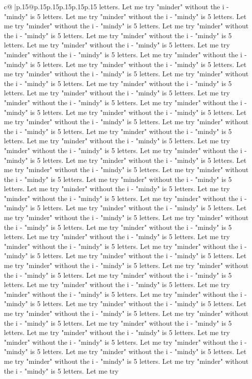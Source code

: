 \documentclass{article}
\begin{document}
{\begin{supertabular}{c@{$\;$}|p{.15\linewidth}@{}p{.15\linewidth}p{.15\linewidth}p{.15\linewidth}p{.15\linewidth}p{.15\linewidth}}
{{{letters. Let me try "minder" without the i {-} "mindy" is 5 letters. Let me try "minder" without the i {-} "mindy" is 5 letters. Let me try "minder" without the i {-} "mindy" is 5 letters. Let me try "minder" without the i {-} "mindy" is 5 letters. Let me try "minder" without the i {-} "mindy" is 5 letters. Let me try "minder" without the i {-} "mindy" is 5 letters. Let me try "minder" without the i {-} "mindy" is 5 letters. Let me try "minder" without the i {-} "mindy" is 5 letters. Let me try "minder" without the i {-} "mindy" is 5 letters. Let me try "minder" without the i {-} "mindy" is 5 letters. Let me try "minder" without the i {-} "mindy" is 5 letters. Let me try "minder" without the i {-} "mindy" is 5 letters. Let me try "minder" without the i {-} "mindy" is 5 letters. Let me try "minder" without the i {-} "mindy" is 5 letters. Let me try "minder" without the i {-} "mindy" is 5 letters. Let me try "minder" without the i {-} "mindy" is 5 letters. Let me try "minder" without the i {-} "mindy" is 5 letters. Let me try "minder" without the i {-} "mindy" is 5 letters. Let me try "minder" without the i {-} "mindy" is 5 letters. Let me try "minder" without the i {-} "mindy" is 5 letters. Let me try "minder" without the i {-} "mindy" is 5 letters. Let me try "minder" without the i {-} "mindy" is 5 letters. Let me try "minder" without the i {-} "mindy" is 5 letters. Let me try "minder" without the i {-} "mindy" is 5 letters. Let me try "minder" without the i {-} "mindy" is 5 letters. Let me try "minder" without the i {-} "mindy" is 5 letters. Let me try "minder" without the i {-} "mindy" is 5 letters. Let me try "minder" without the i {-} "mindy" is 5 letters. Let me try "minder" without the i {-} "mindy" is 5 letters. Let me try "minder" without the i {-} "mindy" is 5 letters. Let me try "minder" without the i {-} "mindy" is 5 letters. Let me try "minder" without the i {-} "mindy" is 5 letters. Let me try "minder" without the i {-} "mindy" is 5 letters. Let me try "minder" without the i {-} "mindy" is 5 letters. Let me try "minder" without the i {-} "mindy" is 5 letters. Let me try "minder" without the i {-} "mindy" is 5 letters. Let me try "minder" without the i {-} "mindy" is 5 letters. Let me try "minder" without the i {-} "mindy" is 5 letters. Let me try "minder" without the i {-} "mindy" is 5 letters. Let me try "minder" without the i {-} "mindy" is 5 letters. Let me try "minder" without the i {-} "mindy" is 5 letters. Let me try "minder" without the i {-} "mindy" is 5 letters. Let me try "minder" without the i {-} "mindy" is 5 letters. Let me try "minder" without the i {-} "mindy" is 5 letters. Let me try "minder" without the i {-} "mindy" is 5 letters. Let me try "minder" without the i {-} "mindy" is 5 letters. Let me try "minder" without the i {-} "mindy" is 5 letters. Let me try "minder" without the i {-} "mindy" is 5 letters. Let me try "minder" without the i {-} "mindy" is 5 letters. Let me try "minder" without the i {-} "mindy" is 5 letters. Let me try "minder" without the i {-} "mindy" is 5 letters. Let me try "minder" without the i {-} "mindy" is 5 letters. Let me try "minder" without the i {-} "mindy" is 5 letters. Let me try }}}
\end{supertabular}}
\end{document}

